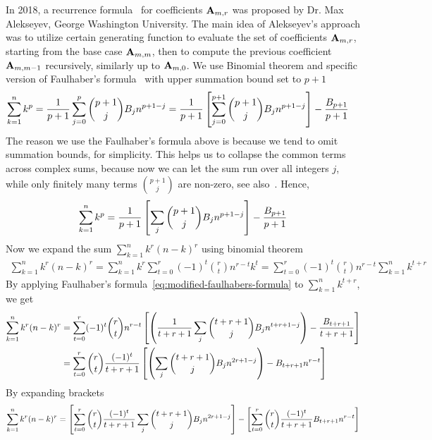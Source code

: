 In 2018, a recurrence formula~\cite{alekseyev2018mathoverflow} for coefficients ${\mathbf{A}} \sb{m,r}$
was proposed by Dr. Max Alekseyev, George Washington University.
The main idea of Alekseyev's approach was to utilize certain generating function to evaluate
the set of coefficients ${\mathbf{A}} \sb{m,r}$,
starting from the base case ${\mathbf{A}} \sb{m,m}$, then to compute the previous coefficient ${\mathbf{A}} \sb{m,m-1}$
recursively, similarly up to ${\mathbf{A}} \sb{m,0}$.
We use Binomial theorem and specific version
of Faulhaber's formula~\cite{beardon1996sums} with upper summation bound set to $p+1$
\begin{align*}
    \sum_{k=1}^{n} k^{p}
    = \frac{1}{p+1}\sum_{j=0}^{p} \binom{p+1}{j} {B}\sb{j} n^{p+1-j}
    &= \frac{1}{p+1} \left[ \sum_{j=0}^{p+1} \binom{p+1}{j} {B}\sb{j} n^{p+1-j} \right] - \frac{{B}\sb{p+1}}{p+1}
\end{align*}
The reason we use the Faulhaber's formula above is because we tend to omit summation bounds, for simplicity.
This helps us to collapse the common terms across complex sums, because now we can let the sum run over all integers $j$,
while only finitely many terms $\binom{p+1}{j}$ are non-zero, see also~\cite{knuth1992two}.
Hence,
\begin{align}
    \label{eq:modified-faulhabers-formula}
    \sum_{k=1}^{n} k^{p}
    = \frac{1}{p+1} \left[ \sum_{j} \binom{p+1}{j} {B}\sb{j} n^{p+1-j} \right] - \frac{{B}\sb{p+1}}{p+1}
\end{align}
Now we expand the sum $\sum_{k=1}^{n} k^{r} (n-k)^{r}$ using binomial theorem
\begin{align*}
    \sum_{k=1}^{n} k^{r} (n-k)^{r}
    = \sum_{k=1}^{n} k^{r} \sum_{t=0}^{r} (-1)^t \binom{r}{t} n^{r-t} k^{t}
    = \sum_{t=0}^{r} (-1)^t \binom{r}{t} n^{r-t} \sum_{k=1}^{n} k^{t+r}
\end{align*}
By applying Faulhaber's formula~\eqref{eq:modified-faulhabers-formula} to $\sum_{k=1}^{n} k^{t+r}$, we get
\begin{align*}
    \sum_{k=1}^{n} k^{r} (n-k)^{r}
    &= \sum_{t=0}^{r} (-1)^t \binom{r}{t} n^{r-t} \left[ \left( \frac{1}{t+r+1} \sum_{j} \binom{t+r+1}{j} {B}\sb{j} n^{t+r+1-j} \right) - \frac{{B}\sb{t+r+1}}{t+r+1} \right] \\
    &= \sum_{t=0}^{r} \binom{r}{t} \frac{(-1)^t}{t+r+1} \left[ \left( \sum_{j} \binom{t+r+1}{j} {B}\sb{j} n^{2r+1-j}  \right) - {B}\sb{t+r+1} n^{r-t} \right]
\end{align*}
By expanding brackets
\begin{align*}
    \sum_{k=1}^{n} k^{r} (n-k)^{r}
    = \left[ \sum_{t=0}^{r} \binom{r}{t} \frac{(-1)^t}{t+r+1} \sum_{j} \binom{t+r+1}{j} {B}\sb{j} n^{2r+1-j}  \right]
    - \left[ \sum_{t=0}^{r} \binom{r}{t} \frac{(-1)^t}{t+r+1} {B}\sb{t+r+1} n^{r-t} \right]
\end{align*}
